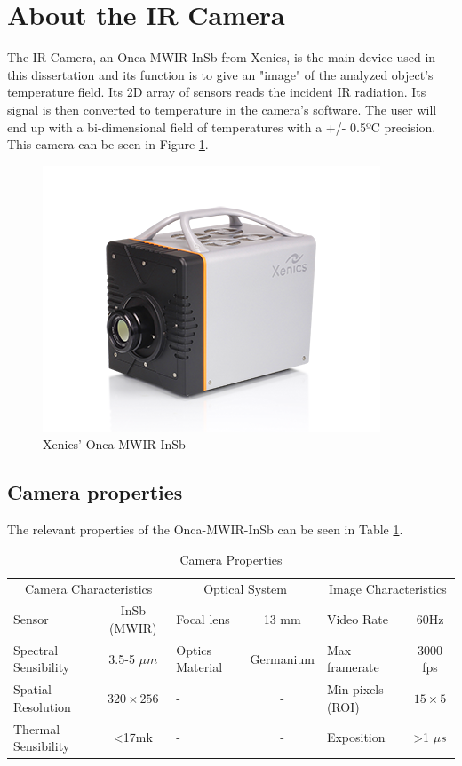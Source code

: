 \section{About the IR Camera}
\label{sec:icam}
The IR Camera, an Onca-MWIR-InSb from Xenics, is the main device used in this dissertation and its function is to give an "image" of the analyzed object's temperature field. Its 2D array of sensors reads the incident IR radiation. Its signal is then converted to temperature in the camera's software. The user will end up with a bi-dimensional field of temperatures with a +/- 0.5ºC precision. This camera can be seen in Figure \ref{fig:onca}.

\begin{figure}[h!]
\centering
\includegraphics[width=0.6\linewidth]{Figures/2.Chapter/onca.png}
\caption{Xenics' Onca-MWIR-InSb}
\label{fig:onca}
\end{figure}

\subsection{Camera properties}

\par The relevant properties of the Onca-MWIR-InSb can be seen in Table \ref{tab:camprop}.

\begin{table}[h]
\centering
\caption{Camera Properties}
\label{tab:camprop}
\begin{tabular}{lclclc}
\toprule
\multicolumn{2}{c}{Camera Characteristics} & \multicolumn{2}{c}{Optical System} & \multicolumn{2}{c}{Image Characteristics} \\
\cmidrule[0.4pt](r{0.125em}){1-2}%
\cmidrule[0.4pt](r{0.125em}){3-4}%
\cmidrule[0.4pt](r{0.125em}){5-6}%
Sensor                 & InSb (MWIR)       & Focal lens          & 13 mm        & Video Rate         & 60Hz                 \\
Spectral Sensibility   & 3.5-5 $\mu m$     & Optics Material     & Germanium    & Max framerate      & 3000 fps             \\
Spatial Resolution     & $320 \times 256$  &  -                  & -            & Min pixels (ROI)   & $15 \times 5$        \\
Thermal Sensibility    & \textless17mk     &   -                 &   -          & Exposition         & \textgreater 1 $\mu s$  \\ \bottomrule
\end{tabular}
\end{table}


